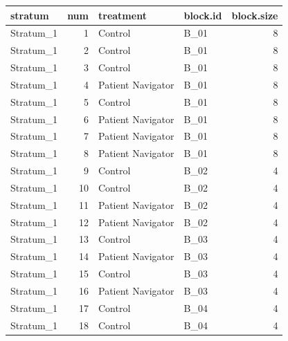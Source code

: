 \documentclass[
]{book}
\newenvironment{Shaded}{\begin{snugshade}}{\end{snugshade}}
\newcommand{\DataTypeTok}[1]{\textcolor[rgb]{0.13,0.29,0.53}{#1}}
\newcommand{\KeywordTok}[1]{\textcolor[rgb]{0.13,0.29,0.53}{\textbf{#1}}}
\newcommand{\NormalTok}[1]{#1}
\newcommand{\OperatorTok}[1]{\textcolor[rgb]{0.81,0.36,0.00}{\textbf{#1}}}
\newcommand{\StringTok}[1]{\textcolor[rgb]{0.31,0.60,0.02}{#1}}
\begin{document}
\begin{Shaded}
\end{Shaded}

\begin{table}[H]
\centering
\begin{tabular}{l|r|l|l|r}
\hline
stratum & num & treatment & block.id & block.size\\
\hline
Stratum\_1 & 1 & Control & B\_01 & 8\\
\hline
Stratum\_1 & 2 & Control & B\_01 & 8\\
\hline
Stratum\_1 & 3 & Control & B\_01 & 8\\
\hline
Stratum\_1 & 4 & Patient Navigator & B\_01 & 8\\
\hline
Stratum\_1 & 5 & Control & B\_01 & 8\\
\hline
Stratum\_1 & 6 & Patient Navigator & B\_01 & 8\\
\hline
Stratum\_1 & 7 & Patient Navigator & B\_01 & 8\\
\hline
Stratum\_1 & 8 & Patient Navigator & B\_01 & 8\\
\hline
Stratum\_1 & 9 & Control & B\_02 & 4\\
\hline
Stratum\_1 & 10 & Control & B\_02 & 4\\
\hline
Stratum\_1 & 11 & Patient Navigator & B\_02 & 4\\
\hline
Stratum\_1 & 12 & Patient Navigator & B\_02 & 4\\
\hline
Stratum\_1 & 13 & Control & B\_03 & 4\\
\hline
Stratum\_1 & 14 & Patient Navigator & B\_03 & 4\\
\hline
Stratum\_1 & 15 & Control & B\_03 & 4\\
\hline
Stratum\_1 & 16 & Patient Navigator & B\_03 & 4\\
\hline
Stratum\_1 & 17 & Control & B\_04 & 4\\
\hline
Stratum\_1 & 18 & Control & B\_04 & 4\\

\end{tabular}
\end{table}
\end{document}
